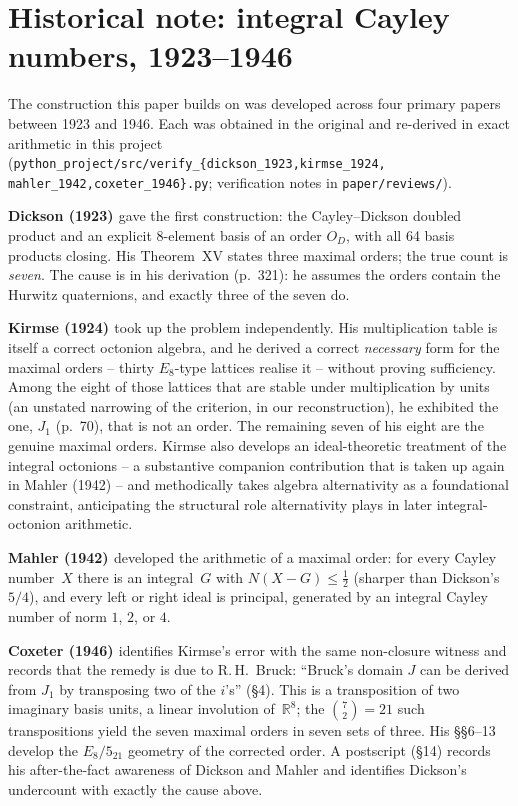 \documentclass[twoside,english]{paper}
\numberwithin{equation}{section}
\numberwithin{figure}{section}
\theoremstyle{definition}
\theoremstyle{remark}
\newcommand{\RR}{\mathbb{R}}
\newcommand{\Nrm}{N}                  %
\begin{document}
\section{Historical note: integral Cayley numbers,
1923--1946}\label{app:history}

The construction this paper builds on was developed across four
primary papers between 1923 and 1946.  Each was obtained in the
original and re-derived in exact arithmetic in this project
(\texttt{python\_project/src/verify\_\{dickson\_1923,kirmse\_1924,%
mahler\_1942,coxeter\_1946\}.py}; verification notes in
\texttt{paper/reviews/}).

\noindent\textbf{Dickson (1923) \cite{Dickson1923}} gave the first
construction: the Cayley--Dickson doubled product and an explicit
8-element basis of an order $O_D$, with all 64 basis products
closing.  His Theorem~XV states three maximal orders; the true count
is \emph{seven}.  The cause is in his derivation (p.~321): he assumes
the orders contain the Hurwitz quaternions, and exactly three of the
seven do.

\noindent\textbf{Kirmse (1924) \cite{Kirmse1924}} took up the problem
independently.  His multiplication table is itself a correct
octonion algebra, and he derived a correct \emph{necessary} form
for the maximal orders -- thirty $E_8$-type lattices realise it --
without proving sufficiency.  Among the eight of those lattices that
are stable under multiplication by units (an unstated narrowing of
the criterion, in our reconstruction), he exhibited the one,
$J_1$ (p.~70), that is not an order.  The remaining seven of his
eight are the genuine maximal orders.  Kirmse also develops an
ideal-theoretic treatment of the integral octonions -- a substantive
companion contribution that is taken up again in Mahler (1942) --
and methodically takes algebra alternativity as a foundational
constraint, anticipating the structural role alternativity plays in
later integral-octonion arithmetic.

\noindent\textbf{Mahler (1942) \cite{Mahler1942}} developed the
arithmetic of a maximal order: for every Cayley number~$X$ there is
an integral~$G$ with $\Nrm(X-G)\le\tfrac12$ (sharper than Dickson's
$5/4$), and every left or right ideal is principal, generated by an
integral Cayley number of norm $1$, $2$, or $4$.

\noindent\textbf{Coxeter (1946) \cite{Coxeter1946}} identifies
Kirmse's error with the same non-closure witness and records that
the remedy is due to R.\,H.~Bruck: ``Bruck's domain $J$ can be
derived from $J_1$ by transposing two of the $i$'s'' (\S4).  This is
a transposition of two imaginary basis units, a linear involution
of~$\RR^8$; the $\binom72 = 21$ such transpositions yield the seven
maximal orders in seven sets of three.  His \S\S6--13 develop the
$E_8/5_{21}$ geometry of the corrected order.  A postscript (\S14)
records his after-the-fact awareness of Dickson and Mahler and
identifies Dickson's undercount with exactly the cause above.
\end{document}
